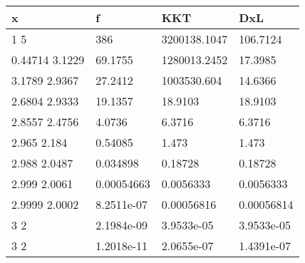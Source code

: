 \begin{tabular}{llll}
x & f & KKT & DxL \\ 
\hline 
1  5 & 386 & 3200138.1047 & 106.7124 \\ 
0.44714      3.1229 & 69.1755 & 1280013.2452 & 17.3985 \\ 
3.1789      2.9367 & 27.2412 & 1003530.604 & 14.6366 \\ 
2.6804      2.9333 & 19.1357 & 18.9103 & 18.9103 \\ 
2.8557      2.4756 & 4.0736 & 6.3716 & 6.3716 \\ 
2.965       2.184 & 0.54085 & 1.473 & 1.473 \\ 
2.988      2.0487 & 0.034898 & 0.18728 & 0.18728 \\ 
2.999      2.0061 & 0.00054663 & 0.0056333 & 0.0056333 \\ 
2.9999      2.0002 & 8.2511e-07 & 0.00056816 & 0.00056814 \\ 
3           2 & 2.1984e-09 & 3.9533e-05 & 3.9533e-05 \\ 
3           2 & 1.2018e-11 & 2.0655e-07 & 1.4391e-07 \\ 
\hline 
\end{tabular}